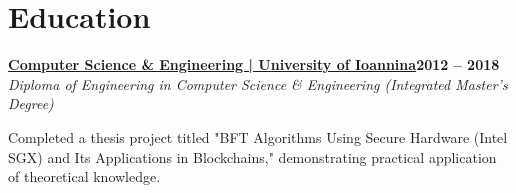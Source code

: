 \documentclass[letterpaper,10pt]{article}
\newcommand{\heading}[2]{
  \hspace{10pt}#1\hfill#2\\
}
\newcommand{\headingBf}[2]{
  \heading{\textbf{#1}}{\textbf{#2}}
}
\newcommand{\headingIt}[2]{
  \heading{\textit{#1}}{\textit{#2}}
}
\newenvironment{resume_list}{
  \vspace{-7pt}
  \begin{itemize}[itemsep=-2px, parsep=1pt, leftmargin=30pt]
}{
  \end{itemize}
}
\newenvironment{resume_list_bullet}{
  \vspace{-7pt}
  \begin{itemize}[itemsep=-1.5px, parsep=0pt, leftmargin=20pt]
}{
  \end{itemize}
}
\begin{document}



  \section{Education}

  \headingBf{\href{https://www.cse.uoi.gr/?lang=en}{\large{Computer Science \& Engineering | University of Ioannina}}}{2012 -- 2018}
  \headingIt{Diploma of Engineering in Computer Science \& Engineering (Integrated Master's Degree)}{}
  \begin{resume_list_bullet}
  \item{Completed a thesis project titled "BFT Algorithms Using Secure Hardware (Intel SGX) and Its Applications in Blockchains," demonstrating practical application of theoretical knowledge.}{}
  \end{resume_list_bullet}




    


  
\end{document}
